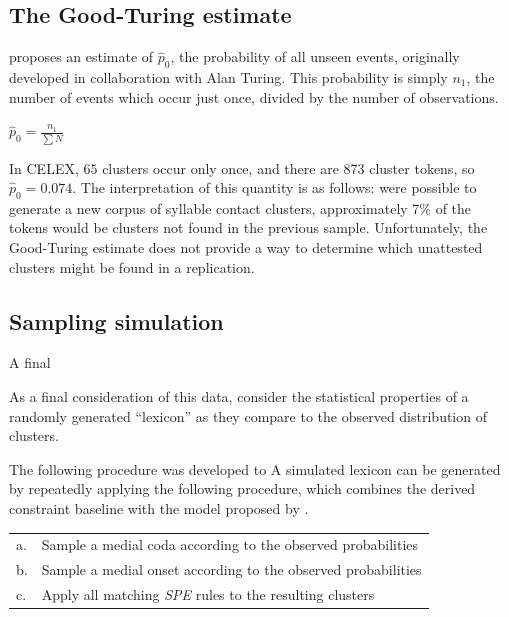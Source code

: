\subsection{The Good-Turing estimate}

\citet{Good1953} proposes an estimate of $\hat{p}_0$, the probability of all unseen events, originally developed in collaboration with Alan Turing. This probability is simply $n_1$, the number of events which occur just once, divided by the number of observations.

\begin{unlabeledexample}
$\displaystyle \hat{p}_0 = \frac{n_1}{\displaystyle\sum N}$ 
\end{unlabeledexample}

\noindent In CELEX, $65$ clusters occur only once, and there are 873 cluster tokens, so $\hat{p}_0 = 0.074$. The interpretation of this quantity is as follows: were possible to generate a new corpus of syllable contact clusters, approximately 7\% of the tokens would be clusters not found in the previous sample. Unfortunately, the Good-Turing estimate does not provide a way to determine which unattested clusters might be found in a replication. 

\subsection{Sampling simulation}

A final 

As a final consideration of this data, consider the statistical properties of a randomly generated ``lexicon'' as they compare to the observed distribution of clusters. 

The following procedure was developed to 
A simulated lexicon can be generated by repeatedly applying the following procedure, which combines the derived constraint baseline with the model proposed by \citet{Pierrehumbert1994}.

\begin{example}
\begin{tabular}{l l}
a. & Sample a medial coda according to the observed probabilities  \\
b. & Sample a medial onset according to the observed probabilities \\
c. & Apply all matching \emph{SPE} rules to the resulting clusters \\
\end{tabular}
\end{example}

